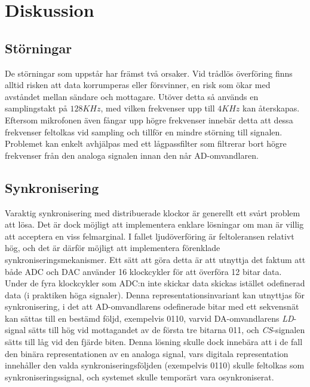 \documentclass[a4paper,10pt]{article}
\begin{document}
\section{Diskussion}
\subsection{Störningar}
De störningar som uppstår har främst två orsaker. Vid trådlös överföring finns 
alltid risken att data korrumperas eller försvinner, en risk som ökar med 
avståndet mellan sändare och mottagare. Utöver detta så används en samplingstakt 
på $128 KHz$, med vilken frekvenser upp till $4 KHz$ kan återskapas. Eftersom 
mikrofonen även fångar upp högre frekvenser innebär detta att dessa 
frekvenser feltolkas vid sampling och tillför en mindre störning till signalen. 
Problemet kan enkelt avhjälpas med ett lågpassfilter som filtrerar bort högre 
frekvenser från den analoga signalen innan den når AD-omvandlaren.

\subsection{Synkronisering}
\label{synkronisering}

Varaktig synkronisering med distribuerade klockor är generellt ett svårt problem 
att lösa. Det är dock möjligt att implementera enklare lösningar om man är
villig att acceptera en viss felmarginal. I fallet ljudöverföring är 
feltoleransen relativt hög, och det är därför möjligt att implementera 
förenklade synkroniseringsmekanismer. Ett sätt att göra detta är att utnyttja 
det faktum att både ADC och DAC använder 16 klockcykler för att överföra 12 
bitar data. Under de fyra klockcykler som ADC:n inte skickar data skickas 
istället odefinerad data (i praktiken höga signaler).
Denna representationsinvariant kan utnyttjas för
synkronisering, i det att AD-omvandlarens odefinerade bitar med ett sekvensnät kan
sättas till en bestämd följd, exempelvis 0110, varvid DA-omvandlarens \emph{LD}-signal sätts till hög vid 
mottagandet av de första tre bitarna 011, och \emph{CS}-signalen sätts till låg vid den 
fjärde biten. Denna lösning skulle dock innebära att i de fall
den binära representationen av en analoga signal, vars digitala representation  
innehåller den valda synkroniseringsföljden (exempelvis 0110) skulle feltolkas som
 synkroniseringssignal, och systemet skulle temporärt vara osynkroniserat.
\end{document}
